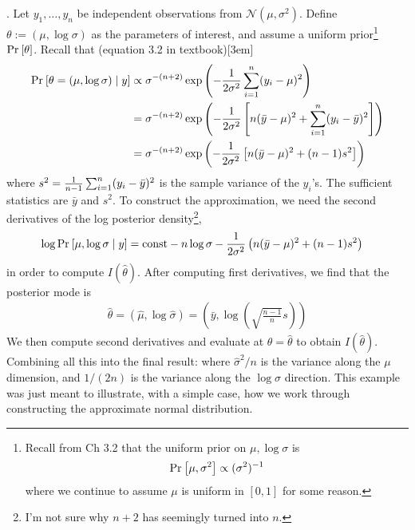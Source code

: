 \documentclass[11pt]{article}
\begin{document}
\myspace{}
\p {}. Let $y_1, \ldots, y_n$ be independent observations from $\mathcal{N}(\mu, \sigma^2)$. Define $\theta := (\mu, \log\sigma)$ as the parameters of interest, and assume a uniform prior\footnote{Recall from Ch 3.2 that the uniform prior on $\mu, \log\sigma$ is
\begin{align}
	\text{Pr}_{}\left[\mu, \sigma^2\right] \propto (\sigma^2)^{-1}
\end{align}
where we continue to assume $\mu$ is uniform in $[0, 1]$ for some reason.
} $\text{Pr}_{}\left[\theta\right]$. Recall that (equation 3.2 in textbook)[3em]
\begin{align}
	\text{Pr}_{}\left[\theta = (\mu, \log\sigma) \mid y\right] 
	&\propto \sigma^{-(n+2)} \exp\left(  - \frac{1}{2\sigma^2} \sum_{i=1}^{n} (y_i - \mu)^2  \right) \\
	&= \sigma^{-(n+2)} \exp\left(  - \frac{1}{2\sigma^2} \left[n(\bar{y} - \mu)^2 + \sum_{i=1}^{n} (y_i - \bar{y})^2 \right] \right) \\
	&= \sigma^{-(n+2)} \exp\left(  - \frac{1}{2\sigma^2} \left[n(\bar{y} - \mu)^2 + (n - 1) s^2 \right] \right)
\end{align}
where $s^2 = \frac{1}{n-1}\sum_{i=1}^{n} (y_i - \bar{y})^2$ is the sample variance of the $y_i$'s. The sufficient statistics are $\bar{y}$ and $s^2$. To construct the approximation, we need the second derivatives of the log posterior density\footnote{I'm not sure why $n+2$ has seemingly turned into $n$.},
\begin{align}
	\log \text{Pr}_{}\left[\mu, \log\sigma \mid y\right] &= \text{const} - n\log\sigma - \frac{1}{2\sigma^2}\left(  n(\bar{y} - \mu)^2 + (n - 1) s^2  \right)
\end{align}
in order to compute $I(\hat{\theta})$. After computing first derivatives, we find that the posterior mode is
\begin{align}
	\hat{\theta} = (\hat{\mu}, \log\hat{\sigma}) = \left( \bar{y}, \log\left( \sqrt{ \frac{n-1}{n}  }s  \right)  \right)
\end{align}
We then compute second derivatives and evaluate at $\theta = \hat{\theta}$ to obtain $I(\hat{\theta})$. Combining all this into the final result:
where $\hat{\sigma}^2/n$ is the variance along the $\mu$ dimension, and $1/(2n)$ is the variance along the $\log\sigma$ direction. This example was just meant to illustrate, with a simple case, how we work through constructing the approximate normal distribution.
\end{document}
